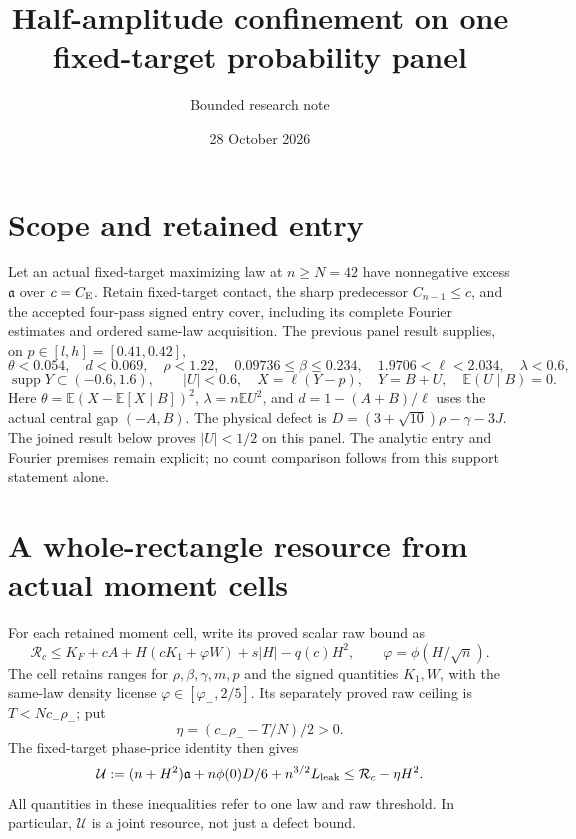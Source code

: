 \documentclass[11pt]{article}
\title{Half-amplitude confinement on one fixed-target probability panel}
\author{Bounded research note}\date{28 October 2026}
\newcommand{\E}{\mathbb E}\newcommand{\CE}{C_{\rm E}}
\begin{document}
\maketitle

\section{Scope and retained entry}
Let an actual fixed-target maximizing law at $n\ge N=42$ have
nonnegative excess $\mathfrak a$ over $c=\CE$. Retain fixed-target contact,
the sharp predecessor $C_{n-1}\le c$, and the accepted four-pass signed
entry cover, including its complete Fourier estimates and ordered
same-law acquisition. The previous panel result supplies, on
$p\in[l,h]=[0.41,0.42]$,
\[
 \theta<0.054,\quad d<0.069,\quad \rho<1.22,
 \quad0.09736\le\beta\le0.234,\quad
 1.9706<\ell<2.034,\quad\lambda<0.6,
\]
\[
 \operatorname{supp}Y\subset(-0.6,1.6),\qquad |U|<0.6,
 \quad X=\ell(Y-p),\quad Y=B+U,\quad\E(U\mid B)=0.
\]
Here $\theta=\E(X-\E[X\mid B])^2$, $\lambda=n\E U^2$, and
$d=1-(A+B)/\ell$ uses the actual central gap $(-A,B)$.
The physical defect is $D=(3+\sqrt{10})\rho-\gamma-3J$.
The joined result below proves $|U|<1/2$ on this panel. The analytic
entry and Fourier premises remain explicit; no count comparison follows
from this support statement alone.

\section{A whole-rectangle resource from actual moment cells}
For each retained moment cell, write its proved scalar raw bound as
\begin{equation}\label{pc:raw}
 \mathcal R_c\le K_F+cA+H(cK_1+\varphi W)+s|H|-q(c)H^2,
 \qquad \varphi=\phi(H/\sqrt n).
\end{equation}
The cell retains ranges for $\rho,\beta,\gamma,m,p$ and the signed
quantities $K_1,W$, with the same-law density license
$\varphi\in[\varphi_-,2/5]$. Its separately proved raw ceiling is
$T<Nc_-\rho_-$; put
\[
 \eta=(c_-\rho_- -T/N)/2>0.
\]
The fixed-target phase-price identity then gives
\begin{equation}\label{pc:resource}
 \mathcal U:=(n+H^2)\mathfrak a+n\phi(0)D/6+n^{3/2}L_{\rm leak}
 \le \mathcal R_c-\eta H^2.
\end{equation}
All quantities in these inequalities refer to one law and raw threshold.
In particular, $\mathcal U$ is a joint resource, not just a defect bound.
\end{document}
